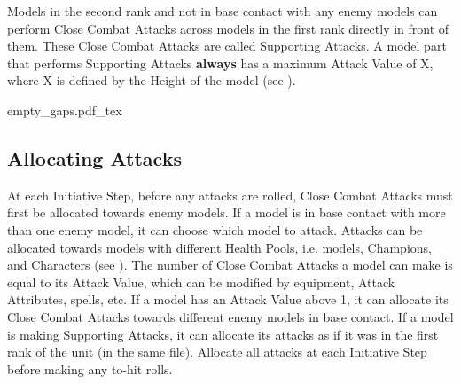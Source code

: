 Models in the second rank and not in base contact with any enemy models can perform Close Combat Attacks across models in the first rank directly in front of them. These Close Combat Attacks are called Supporting Attacks. A model part that performs Supporting Attacks \textbf{always} has a maximum Attack Value of X, where X is defined by the Height of the model (see ).

\begin{Figure}
	\Fanchor
	\centering
	\renewcommand{\figbiglettersize}{22}
	\def\svgwidth{0.76\textwidth}
	{empty_gaps.pdf_tex}
	\caption{Which models can attack?\captionposttitle
		Models colour-coded with a darker shade can all strike. Models with a bold frame count as being in base contact with an enemy; note that models are considered to be in base contact across gaps. Models colour-coded with a lighter shade cannot make Supporting Attacks.\captionpar
		Unit C is in Line Formation and thus both the second and third rank can make Supporting Attacks. Unit B is not Engaged in its Front Facing; its models cannot make Supporting Attacks to their Flank or Rear; they could only strike across the first rank.%
	}
	\label{figure/empty_gaps}
\end{Figure}

\subsection{Allocating Attacks}
\label{allocation_attacks}\label{allocating_attacks}

At each Initiative Step, before any attacks are rolled, Close Combat Attacks must first be allocated towards enemy models. If a model is in base contact with more than one enemy model, it can choose which model to attack. Attacks can be allocated towards models with different Health Pools, i.e. \rnf{} models, Champions, and Characters (see ). The number of Close Combat Attacks a model can make is equal to its Attack Value, which can be modified by equipment, Attack Attributes, spells, etc. If a model has an Attack Value above 1, it can allocate its Close Combat Attacks towards different enemy models in base contact. If a model is making Supporting Attacks, it can allocate its attacks as if it was in the first rank of the unit (in the same file). Allocate all attacks at each Initiative Step before making any to-hit rolls.

